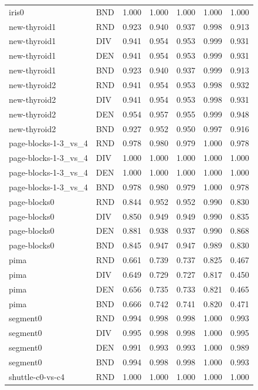\documentclass[10pt,a4paper]{article}
\begin{document}
\begin{longtable}{lllllrr}
iris0 & BND & 1.000 & 1.000 & 1.000 & 1.000 & 1.000 \\
new-thyroid1 & RND & 0.923 & 0.940 & 0.937 & 0.998 & 0.913 \\
new-thyroid1 & DIV & 0.941 & 0.954 & 0.953 & 0.999 & 0.931 \\
new-thyroid1 & DEN & 0.941 & 0.954 & 0.953 & 0.999 & 0.931 \\
new-thyroid1 & BND & 0.923 & 0.940 & 0.937 & 0.999 & 0.913 \\
new-thyroid2 & RND & 0.941 & 0.954 & 0.953 & 0.998 & 0.932 \\
new-thyroid2 & DIV & 0.941 & 0.954 & 0.953 & 0.998 & 0.931 \\
new-thyroid2 & DEN & 0.954 & 0.957 & 0.955 & 0.999 & 0.948 \\
new-thyroid2 & BND & 0.927 & 0.952 & 0.950 & 0.997 & 0.916 \\
page-blocks-1-3\_vs\_4 & RND & 0.978 & 0.980 & 0.979 & 1.000 & 0.978 \\
page-blocks-1-3\_vs\_4 & DIV & 1.000 & 1.000 & 1.000 & 1.000 & 1.000 \\
page-blocks-1-3\_vs\_4 & DEN & 1.000 & 1.000 & 1.000 & 1.000 & 1.000 \\
page-blocks-1-3\_vs\_4 & BND & 0.978 & 0.980 & 0.979 & 1.000 & 0.978 \\
page-blocks0 & RND & 0.844 & 0.952 & 0.952 & 0.990 & 0.830 \\
page-blocks0 & DIV & 0.850 & 0.949 & 0.949 & 0.990 & 0.835 \\
page-blocks0 & DEN & 0.881 & 0.938 & 0.937 & 0.990 & 0.868 \\
page-blocks0 & BND & 0.845 & 0.947 & 0.947 & 0.989 & 0.830 \\
pima & RND & 0.661 & 0.739 & 0.737 & 0.825 & 0.467 \\
pima & DIV & 0.649 & 0.729 & 0.727 & 0.817 & 0.450 \\
pima & DEN & 0.656 & 0.735 & 0.733 & 0.821 & 0.465 \\
pima & BND & 0.666 & 0.742 & 0.741 & 0.820 & 0.471 \\
segment0 & RND & 0.994 & 0.998 & 0.998 & 1.000 & 0.993 \\
segment0 & DIV & 0.995 & 0.998 & 0.998 & 1.000 & 0.995 \\
segment0 & DEN & 0.991 & 0.993 & 0.993 & 1.000 & 0.989 \\
segment0 & BND & 0.994 & 0.998 & 0.998 & 1.000 & 0.993 \\
shuttle-c0-vs-c4 & RND & 1.000 & 1.000 & 1.000 & 1.000 & 1.000 \\

\end{longtable}
\end{document}
